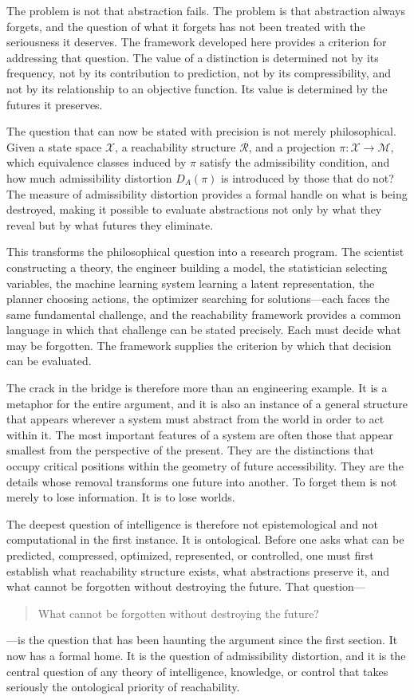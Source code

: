 \documentclass[12pt,a4paper]{article}
\theoremstyle{plain}
\theoremstyle{definition}
\theoremstyle{remark}
\begin{document}
The problem is not that abstraction fails. The problem is that abstraction
always forgets, and the question of what it forgets has not been treated
with the seriousness it deserves. The framework developed here provides a
criterion for addressing that question. The value of a distinction is
determined not by its frequency, not by its contribution to prediction, not
by its compressibility, and not by its relationship to an objective function.
Its value is determined by the futures it preserves.

The question that can now be stated with precision is not merely
philosophical. Given a state space $\mathcal{X}$, a reachability structure
$\mathcal{R}$, and a projection $\pi : \mathcal{X} \rightarrow \mathcal{M}$,
which equivalence classes induced by $\pi$ satisfy the admissibility
condition, and how much admissibility distortion $D_A(\pi)$ is introduced
by those that do not? The measure of admissibility distortion provides a
formal handle on what is being destroyed, making it possible to evaluate
abstractions not only by what they reveal but by what futures they eliminate.

This transforms the philosophical question into a research program. The
scientist constructing a theory, the engineer building a model, the
statistician selecting variables, the machine learning system learning a
latent representation, the planner choosing actions, the optimizer searching
for solutions---each faces the same fundamental challenge, and the
reachability framework provides a common language in which that challenge
can be stated precisely. Each must decide what may be forgotten. The
framework supplies the criterion by which that decision can be evaluated.

The crack in the bridge is therefore more than an engineering example. It is
a metaphor for the entire argument, and it is also an instance of a general
structure that appears wherever a system must abstract from the world in
order to act within it. The most important features of a system are often
those that appear smallest from the perspective of the present. They are the
distinctions that occupy critical positions within the geometry of future
accessibility. They are the details whose removal transforms one future into
another. To forget them is not merely to lose information. It is to lose
worlds.

The deepest question of intelligence is therefore not epistemological and not
computational in the first instance. It is ontological. Before one asks what
can be predicted, compressed, optimized, represented, or controlled, one
must first establish what reachability structure exists, what abstractions
preserve it, and what cannot be forgotten without destroying the future.
That question---
\begin{quote}
  What cannot be forgotten without destroying the future?
\end{quote}
---is the question that has been haunting the argument since the first section.
It now has a formal home. It is the question of admissibility distortion,
and it is the central question of any theory of intelligence, knowledge, or
control that takes seriously the ontological priority of reachability.
\end{document}
